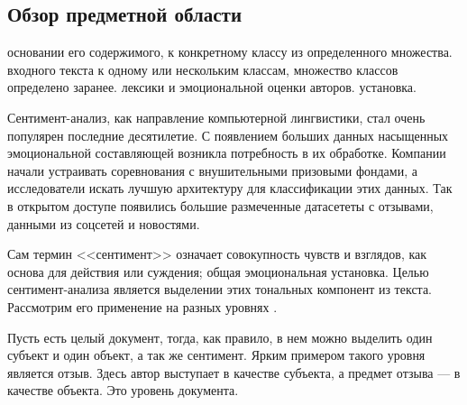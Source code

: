 \subsection{Обзор предметной области}

основании его содержимого, к конкретному классу из определенного множества.
%
входного текста к одному или нескольким классам, множество классов определено заранее.
%
лексики и эмоциональной оценки авторов.
%
установка.

\par
Сентимент-анализ, как направление компьютерной лингвистики, стал очень популярен последние десятилетие. С
появлением больших данных насыщенных эмоциональной составляющей возникла потребность в их обработке. Компании
начали устраивать соревнования с внушительными призовыми фондами, а исследователи искать лучшую архитектуру
для классификации этих данных. Так в открытом доступе появились большие размеченные датасететы с отзывами,
данными из соцсетей и новостями.

\bigskip\par
Сам термин <<сентимент>> означает совокупность чувств и взглядов, как основа для действия или суждения; общая
эмоциональная установка. Целью сентимент-анализа является выделении этих тональных компонент из текста.
Рассмотрим его применение на разных уровнях \cite{Semina}.

\bigskip\par
Пусть есть целый документ, тогда, как правило, в нем можно выделить один субъект и один объект, а так же
сентимент. Ярким примером такого уровня является отзыв. Здесь автор выступает в качестве субъекта, а предмет
отзыва --- в качестве объекта. Это уровень документа.

